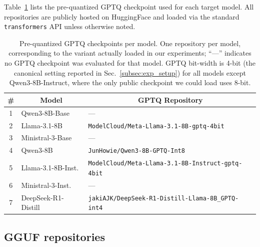 Table~\ref{tab:gptq_awq} lists the pre-quantized GPTQ checkpoint used for each target model.
All repositories are publicly hosted on HuggingFace and loaded via the standard \texttt{transformers} API unless otherwise noted.

\begin{table}[h]
\centering
\caption{Pre-quantized GPTQ checkpoints per model.
One repository per model, corresponding to the variant actually loaded in our experiments;
``---'' indicates no GPTQ checkpoint was evaluated for that model.
GPTQ bit-width is 4-bit (the canonical setting reported in Sec.~\ref{subsec:exp_setup}) for all models except Qwen3-8B-Instruct, where the only public checkpoint we could load uses 8-bit.}
\label{tab:gptq_awq}
\small
\setlength{\tabcolsep}{4pt}
\begin{tabular}{@{}cl l@{}}%
\toprule
\multicolumn{1}{c}{\textbf{\#}} & \multicolumn{1}{c}{\textbf{Model}} & \multicolumn{1}{c}{\textbf{GPTQ Repository}} \\
\midrule
1  & Qwen3-8B-Base       & --- \\
2  & Llama-3.1-8B        & \texttt{ModelCloud/Meta-Llama-3.1-8B-gptq-4bit} \\
3  & Ministral-3-Base    & --- \\
4  & Qwen3-8B            & \texttt{JunHowie/Qwen3-8B-GPTQ-Int8} \\
5  & Llama-3.1-8B-Inst.  & \texttt{ModelCloud/Meta-Llama-3.1-8B-Instruct-gptq-4bit} \\
6  & Ministral-3-Inst.   & --- \\
7  & DeepSeek-R1-Distill & \texttt{jakiAJK/DeepSeek-R1-Distill-Llama-8B\_GPTQ-int4} \\
\bottomrule
\end{tabular}
\end{table}


\subsection{GGUF repositories}
\label{app:gguf_repos}

